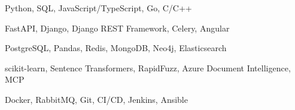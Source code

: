 %
%
%


\begin{keywords}
        {Python, SQL, JavaScript/TypeScript, Go, C/C++}

        {FastAPI, Django, Django REST Framework, Celery, Angular}

        {PostgreSQL, Pandas, Redis, MongoDB, Neo4j, Elasticsearch}

        {scikit-learn, Sentence Transformers, RapidFuzz, Azure Document Intelligence, MCP}

        {Docker, RabbitMQ, Git, CI/CD, Jenkins, Ansible}

\end{keywords}